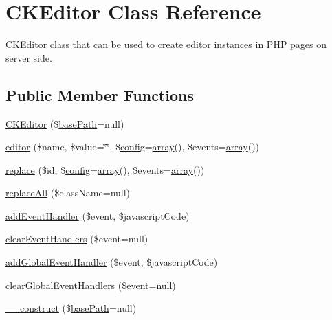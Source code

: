 \hypertarget{classCKEditor}{
\section{CKEditor Class Reference}
\label{classCKEditor}
}


\hyperlink{classCKEditor}{CKEditor} class that can be used to create editor instances in PHP pages on server side.  


\subsection*{Public Member Functions}
\begin{DoxyCompactItemize}
\item 
\hyperlink{classCKEditor_af5592b1cfc47d4b2af1d1c058e2ff548}{CKEditor} (\$\hyperlink{standalone_8php_a94a267f018012b013582daafb6a89618}{basePath}=null)
\item 
\hyperlink{classCKEditor_a7379361d078919956eb2ce371f0e85d9}{editor} (\$name, \$value=\char`\"{}\char`\"{}, \$\hyperlink{events_8php_a3f176ffce3afa63656bfc989470e3e24}{config}=\hyperlink{list_8php_aa3205d038c7f8feb5c9f01ac4dfadc88}{array}(), \$events=\hyperlink{list_8php_aa3205d038c7f8feb5c9f01ac4dfadc88}{array}())
\item 
\hyperlink{classCKEditor_ac798a39de3a7a9e96295b34dd497d73c}{replace} (\$id, \$\hyperlink{events_8php_a3f176ffce3afa63656bfc989470e3e24}{config}=\hyperlink{list_8php_aa3205d038c7f8feb5c9f01ac4dfadc88}{array}(), \$events=\hyperlink{list_8php_aa3205d038c7f8feb5c9f01ac4dfadc88}{array}())
\item 
\hyperlink{classCKEditor_ae4962c323d713734f27740845a315c68}{replaceAll} (\$className=null)
\item 
\hyperlink{classCKEditor_a016cd23cfdcf8e5dff8555129776f80d}{addEventHandler} (\$event, \$javascriptCode)
\item 
\hyperlink{classCKEditor_a711b8195ab3ccc474b2a13a2d6639787}{clearEventHandlers} (\$event=null)
\item 
\hyperlink{classCKEditor_af31450c711eefdf7b446e53feae93b98}{addGlobalEventHandler} (\$event, \$javascriptCode)
\item 
\hyperlink{classCKEditor_ad67af605e90bb21364347dffab4b6c08}{clearGlobalEventHandlers} (\$event=null)
\item 
\hyperlink{classCKEditor_a8ae3723f80da5cc6652f2f0b059824fd}{\_\-\_\-construct} (\$\hyperlink{standalone_8php_a94a267f018012b013582daafb6a89618}{basePath}=null)
\item 

\end{DoxyCompactItemize}
